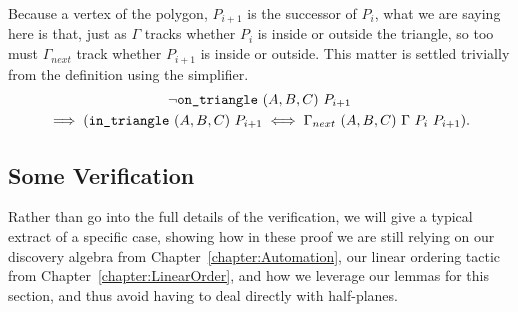 Because a vertex of the polygon, $P_{i+1}$ is the successor of $P_i$, what we are saying here is that, just as $\Gamma$ tracks whether $P_i$ is inside or outside the triangle, so too must $\Gamma_{next}$ track whether $P_{i+1}$ is inside or outside. This matter is settled trivially from the definition using the simplifier.
\begin{multline}
\neg\texttt{on\_triangle}\ (A,B,C)\ P_{i+1}\\
\implies (\texttt{in\_triangle}\ (A,B,C)\ P_{i+1} \iff \Gamma_{next}\ (A,B,C)\ \Gamma\ P_i\ P_{i+1}).
\end{multline}

\subsection{Some Verification}
Rather than go into the full details of the verification, we will give a typical extract of a specific case, showing how in these proof we are still relying on our discovery algebra from Chapter~\ref{chapter:Automation}, our linear ordering tactic from Chapter~\ref{chapter:LinearOrder}, and how we leverage our lemmas for this section, and thus avoid having to deal directly with half-planes.

